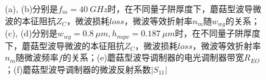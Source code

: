 \begin{figure}[htb]
{\begin{minipage}[]{0.5\textwidth}
		\end{minipage}}
	\caption{(a), (b)分别是$f_m = 40~GHz$时，在不同量子阱厚度下，蘑菇型波导微波的本征阻抗$Z_C$，微波损耗$loss$，微波等效折射率$n_m$随$w_{wg}$的关系；(c), (d)分别是$w_{wg} = 0.8 ~\mu m, h_{mqw} = 0.187 ~\mu m$时，在不同量子阱厚度下，蘑菇型波导微波的本征阻抗$Z_C$，微波损耗$loss$，微波等效折射率$n_m$随微波频率$f$的关系；(e)蘑菇型波导调制器的电光调制器带宽$R_{EO}$；(f)蘑菇型波导调制器的微波反射系数$|S_{11}|$}
	\label{fig_ch2_ms_3dB_S11}
\end{figure}

